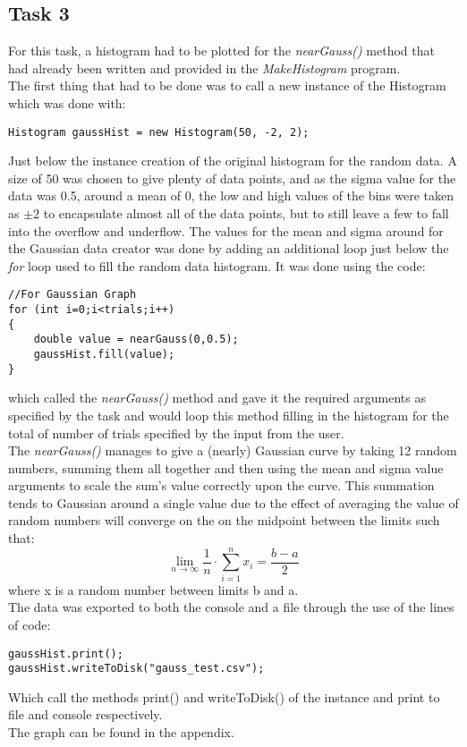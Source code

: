 \documentclass{article}
\begin{document}
\begin{multicols}{2}
\section{Task 3}
For this task, a histogram had to be plotted for the \textit{nearGauss()} method that had already been written and provided in the \textit{MakeHistogram} program. \\ \indent The first thing that had to be done was to call a new instance of the Histogram which was done with:
\begin{lstlisting}
Histogram gaussHist = new Histogram(50, -2, 2);
\end{lstlisting}
Just below the instance creation of the original histogram for the random data. A size of 50 was chosen to give plenty of data points, and as the sigma value for the data was 0.5, around a mean of 0, the low and high values of the bins were taken as $\pm 2$ to encapsulate almost all of the data points, but to still leave a few to fall into the overflow and underflow. The values for the mean and sigma around for the Gaussian data creator was done by adding an additional loop just below the \textit{for} loop used to fill the random data histogram. It was done using the code:
\begin{lstlisting}
//For Gaussian Graph
for (int i=0;i<trials;i++) 
{
	double value = nearGauss(0,0.5);
	gaussHist.fill(value);
}
\end{lstlisting}
which called the \textit{nearGauss()} method and gave it the required arguments as specified by the task and would loop this method filling in the histogram for the total of number of trials specified by the input from the user. \\ \indent The \textit{nearGauss()} manages to give a (nearly) Gaussian curve by taking 12 random numbers, summing them all together and then using the mean and sigma value arguments to scale the sum's value correctly upon the curve. This summation tends to Gaussian around a single value due to the effect of averaging the value of random numbers will converge on the on the midpoint between the limits such that:
\begin{equation}
\lim_{n\to\infty} \frac{1}{n} \cdot \sum_{i=1}^{n}x_i = \frac{b-a}{2}
\end{equation} 
where x is a random number between limits b and a. \\ \indent The data was exported to both the console and a file through the use of the lines of code:
\begin{lstlisting}
gaussHist.print();             
gaussHist.writeToDisk("gauss_test.csv");
\end{lstlisting}
Which call the methods print() and writeToDisk() of the instance and print to file and console respectively. \\ \indent The graph can be found in the appendix.


\end{multicols}
\end{document}

